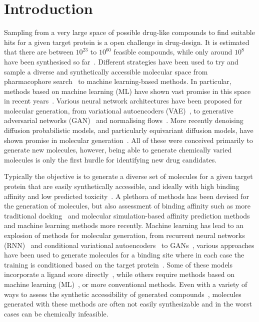 \documentclass[journal=jacsat,manuscript=article]{achemso}
\begin{document}
\section{Introduction}
\label{sec:intro}
Sampling from a very large space of possible drug-like compounds to find suitable hits for a given target protein is a open challenge in drug-design. It is estimated that there are between $10^{23}$ to $10^{60}$ feasible compounds, while only around $10^8$ have been synthesised so far~\cite{polishchuk2013estimation, reymond2012exploring}. Different strategies have been used   to try and sample a diverse and synthetically accessible molecular space from pharmacophore search~\cite{schwab2010conformations} to machine learning-based methods. In particular, methods based on machine learning (ML) have shown vast promise in this space in recent years~\cite{bilodeau2022generative}. Various neural network architectures have been proposed for molecular generation, from variational autoencoders (VAE)~\cite{kingma2022autoencoding, jin2018junction, ma2018constrained, ragoza2022generating}, to generative adversarial networks (GAN)~\cite{hoffmann2019generating} and normalising flows~\cite{shi2021learning}. More recently denoising diffusion probabilistic models, and particularly equivariant diffusion models, have shown promise in molecular generation~\cite{xu2022geodiff, hoogeboom2022equivariant}. All of these were conceived primarily to generate new molecules, however, being able to generate chemically varied molecules is only the first hurdle for identifying new drug candidates.

Typically the objective is to generate a diverse set of molecules for a given target protein that are easily synthetically accessible, and ideally with high binding affinity and low predicted toxicity~\cite{prieto-martinez2019chapter}. A plethora of methods has been devised for the generation of molecules, but also assessment of binding affinity such as more traditional docking~\cite{fu2018predictive} and molecular simulation-based affinity prediction methods~\cite{mey2016blinded,mey2020best} and machine learning methods more recently. Machine learning has lead to an explosion of methods for molecular generation, from recurrent neural networks (RNN)~\cite{xu2021novo,zhang2022novo} and conditional variational autoencoders~\cite{ragoza2022generating} to GANs~\cite{skalic2019target}, various approaches have been used to generate molecules for a binding site where in each case the training is conditioned based on the target protein~\cite{xie2022advances}. Some of these models incorporate a ligand score directly~\cite{ragoza2022generating}, while others require methods based on machine learning (ML)~\cite{masters2023deep}, or more conventional methods. Even with a variety of ways to assess the synthetic accessibility of generated compounds~\cite{coley2018scscore, thakkar2021retrosynthetic}, molecules generated with these methods are often not easily synthesizable and in the worst cases can be chemically infeasible. 
\end{document}
